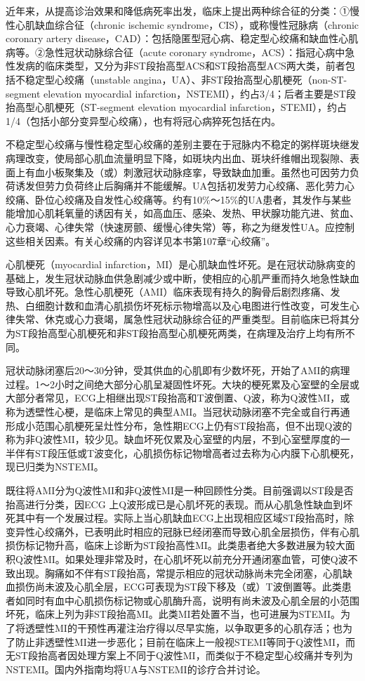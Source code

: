 近年来，从提高诊治效果和降低病死率出发，临床上提出两种综合征的分类：①慢性心肌缺血综合征（chronic
ischemic syndrome，CIS），或称慢性冠脉病（chronic coronary artery
disease，CAD）：包括隐匿型冠心病、稳定型心绞痛和缺血性心肌病等。②急性冠状动脉综合征（acute
coronary
syndrome，ACS）：指冠心病中急性发病的临床类型，又分为非ST段抬高型ACS和ST段抬高型ACS两大类，前者包括不稳定型心绞痛（unstable
angina，UA）、非ST段抬高型心肌梗死（non-ST-segment elevation myocardial
infarction，NSTEMI），约占3/4；后者主要是ST段抬高型心肌梗死（ST-segment
elevation myocardial
infarction，STEMI），约占1/4（包括小部分变异型心绞痛），也有将冠心病猝死包括在内。

不稳定型心绞痛与慢性稳定型心绞痛的差别主要在于冠脉内不稳定的粥样斑块继发病理改变，使局部心肌血流量明显下降，如斑块内出血、斑块纤维帽出现裂隙、表面上有血小板聚集及（或）刺激冠状动脉痉挛，导致缺血加重。虽然也可因劳力负荷诱发但劳力负荷终止后胸痛并不能缓解。UA包括初发劳力心绞痛、恶化劳力心绞痛、卧位心绞痛及自发性心绞痛等。约有10\%～15\%的UA患者，其发作与某些能增加心肌耗氧量的诱因有关，如高血压、感染、发热、甲状腺功能亢进、贫血、心力衰竭、心律失常（快速房颤、缓慢心律失常）等，称之为继发性UA。应控制这些相关因素。有关心绞痛的内容详见本书第107章“心绞痛”。

心肌梗死（myocardial
infarction，MI）是心肌缺血性坏死。是在冠状动脉病变的基础上，发生冠状动脉血供急剧减少或中断，使相应的心肌严重而持久地急性缺血导致心肌坏死。急性心肌梗死（AMI）临床表现有持久的胸骨后剧烈疼痛、发热、白细胞计数和血清心肌损伤坏死标示物增高以及心电图进行性改变，可发生心律失常、休克或心力衰竭，属急性冠状动脉综合征的严重类型。目前临床已将其分为ST段抬高型心肌梗死和非ST段抬高型心肌梗死两类，在病理及治疗上均有所不同。

冠状动脉闭塞后20～30分钟，受其供血的心肌即有少数坏死，开始了AMI的病理过程。1～2小时之间绝大部分心肌呈凝固性坏死。大块的梗死累及心室壁的全层或大部分者常见，ECG上相继出现ST段抬高和T波倒置、Q波，称为Q波性MI，或称为透壁性心梗，是临床上常见的典型AMI。当冠状动脉闭塞不完全或自行再通形成小范围心肌梗死呈灶性分布，急性期ECG上仍有ST段抬高，但不出现Q波的称为非Q波性MI，较少见。缺血坏死仅累及心室壁的内层，不到心室壁厚度的一半伴有ST段压低或T波变化，心肌损伤标记物增高者过去称为心内膜下心肌梗死，现已归类为NSTEMI。

既往将AMI分为Q波性MI和非Q波性MI是一种回顾性分类。目前强调以ST段是否抬高进行分类，因ECG
上Q波形成已是心肌坏死的表现。而从心肌急性缺血到坏死其中有一个发展过程。实际上当心肌缺血ECG上出现相应区域ST段抬高时，除变异性心绞痛外，已表明此时相应的冠脉已经闭塞而导致心肌全层损伤，伴有心肌损伤标记物升高，临床上诊断为ST段抬高性MI。此类患者绝大多数进展为较大面积Q波性MI。如果处理非常及时，在心肌坏死以前充分开通闭塞血管，可使Q波不致出现。胸痛如不伴有ST段抬高，常提示相应的冠状动脉尚未完全闭塞，心肌缺血损伤尚未波及心肌全层，ECG可表现为ST段下移及（或）T波倒置等。此类患者如同时有血中心肌损伤标记物或心肌酶升高，说明有尚未波及心肌全层的小范围坏死，临床上列为非ST段抬高MI。此类MI若处置不当，也可进展为STEMI。为了将透壁性MI的干预性再灌注治疗得以尽早实施，以争取更多的心肌存活；也为了防止非透壁性MI进一步恶化；目前在临床上一般视STEMI等同于Q波性MI，而无ST段抬高者因处理方案上不同于Q波性MI，而类似于不稳定型心绞痛并专列为NSTEMI。国内外指南均将UA与NSTEMI的诊疗合并讨论。

